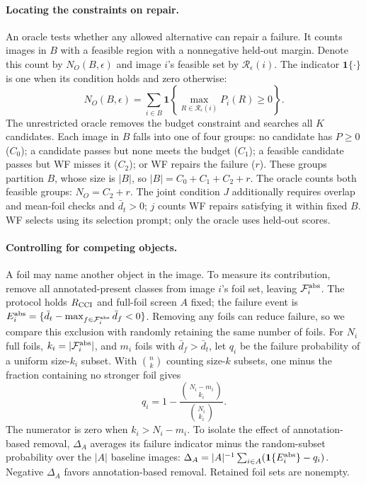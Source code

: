 \documentclass[10pt]{article}
\newcommand{\foils}{\mathcal F}
\newcommand{\regions}{\mathcal R}
\begin{document}
\paragraph{Locating the constraints on repair.}
An oracle tests whether any allowed alternative can repair a failure.
It counts images in $B$ with a feasible region
with a nonnegative held-out margin. Denote this count by $N_O(B,\epsilon)$
and image $i$'s feasible set by $\regions_\epsilon(i)$. The indicator
$\mathbf1\{\cdot\}$ is one when its condition holds and zero otherwise:
\begin{equation}
N_O(B,\epsilon)=\sum_{i\in B}\mathbf1\!\left\{
\max_{R\in\regions_\epsilon(i)}P_i(R)\ge0\right\}.
\label{eq:oracle}
\end{equation}
The unrestricted oracle removes the budget constraint and searches all
$K$ candidates. Each image in $B$ falls into one of four groups: no
candidate has $P\ge0$ ($C_0$); a candidate passes but none meets the
budget ($C_1$); a feasible candidate passes but WF misses it ($C_2$);
or WF repairs the failure ($r$).
These groups partition $B$, whose size is $|B|$, so
$|B|=C_0+C_1+C_2+r$. The oracle counts both feasible groups: $N_O=C_2+r$.
The joint condition $J$ additionally requires overlap and mean-foil checks
and $\bar d_t>0$; $j$ counts WF repairs satisfying it within fixed $B$.
WF selects using its selection prompt; only the oracle uses held-out scores.

\paragraph{Controlling for competing objects.}
A foil may name another object in the image. To measure its contribution,
remove all annotated-present classes from image $i$'s foil set, leaving
$\foils_i^{\rm abs}$. The protocol holds $R_{\rm CCI}$ and full-foil screen $A$ fixed;
the failure event is $E_i^{\rm abs}=\{\bar d_t-\max_{f\in\foils_i^{\rm abs}}\bar d_f<0\}$.
Removing any foils can reduce failure, so we compare this exclusion with
randomly retaining the same number of foils. For $N_i$ full
foils, $k_i=|\foils_i^{\rm abs}|$, and $m_i$ foils with $\bar d_f>\bar d_t$,
let $q_i$ be the failure probability of a uniform size-$k_i$ subset.
With $\binom{n}{k}$ counting size-$k$ subsets, one minus the fraction
containing no stronger foil gives
\begin{equation}
q_i=1-\frac{\binom{N_i-m_i}{k_i}}{\binom{N_i}{k_i}}.
\label{eq:matched}
\end{equation}
The numerator is zero when $k_i>N_i-m_i$. To isolate the effect of
annotation-based removal, $\Delta_A$ averages its failure indicator minus
the random-subset probability over the $|A|$ baseline images:
$\Delta_A=|A|^{-1}\sum_{i\in A}(\mathbf1\{E_i^{\rm abs}\}-q_i)$.
Negative $\Delta_A$ favors annotation-based removal. Retained foil sets are nonempty.
\end{document}
